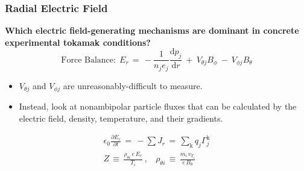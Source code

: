 \documentclass[10pt]{beamer}
\begin{document}
\begin{frame} %
\frametitle{Radial Electric Field}
\textbf{Which electric field-generating mechanisms are dominant in concrete experimental tokamak conditions?}
\begin{equation} %
	\text{Force Balance:}~~E_r \,=\, -\frac{1}{n_j e_j}
		\frac{\text{d} p_j}{\text{d} r} ~+~ V_{\theta j} B_\phi
		~-~ V_{\phi j} B_\theta \label{eq:E_r}
\end{equation}
\begin{itemize}
	\item $V_{\theta j}$ and $V_{\phi j}$ are unreasonably-difficult to measure.
	\item Instead, look at nonambipolar particle fluxes that can be calculated by the electric field, density, temperature, and their gradients.
\end{itemize}
\begin{align} %
	\epsilon_0 \frac{\partial E_r}{\partial t} \,=\, -\sum J_r \,=\,
		\sum_\text{k} q_j\Gamma_j^\text{k} \label{eq:ambipolarity_constraint} \\
	Z \,\equiv\, \frac{\rho_{\theta i} \, e \, E_r}{T_i}~, ~~~~
		\rho_{\theta i} \,\equiv\, \frac{m_i \, v_{T_i}}{e \, B_\theta}
		\label{eq:Z_and_rho_definitions}
\end{align}
\end{frame}

\end{document}

